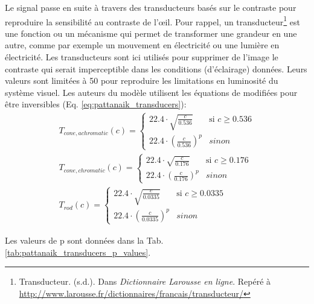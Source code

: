 	\par Le signal passe en suite à travers des transducteurs basés sur le contraste pour reproduire la sensibilité au contraste de l'œil. Pour rappel, un transducteur\footnote{Transducteur. (s.d.). Dans \textit{Dictionnaire Larousse en ligne}. Repéré à \url{http://www.larousse.fr/dictionnaires/francais/transducteur/}} est une fonction ou un mécanisme qui permet de transformer une grandeur en une autre, comme par exemple un mouvement en électricité ou une lumière en électricité. Les transducteurs sont ici utilisés pour supprimer de l'image le contraste qui serait imperceptible dans les conditions (d'éclairage) données. Leurs valeurs sont limitées à 50 pour reproduire les limitations en luminosité du système visuel. Les auteurs du modèle utilisent les équations de \citep{watson_model_1997} modifiées pour être inversibles (Eq. \ref{eq:pattanaik_transducers}):
	\begin{equation}
	\begin{array}{c}
	
	T_{cone,achromatic}(c) = \begin{cases}
	22.4 \cdot \sqrt{\frac{c}{0.536}} & \mbox{si } c \geq 0.536\\
	22.4 \cdot \left( \frac{c}{0.536} \right)^p & sinon
	\end{cases}\\
	
	T_{cone,chromatic}(c) = \begin{cases}
	22.4 \cdot \sqrt{\frac{c}{0.176}} & \mbox{si } c \geq 0.176\\
	22.4 \cdot \left( \frac{c}{0.176} \right)^p & sinon
	\end{cases}\\
	
	T_{rod}(c) = \begin{cases}
	22.4 \cdot \sqrt{\frac{c}{0.0335}} & \mbox{si } c \geq 0.0335\\
	22.4 \cdot \left( \frac{c}{0.0335} \right)^p & sinon
	\end{cases}
	
	\end{array}
	\label{eq:pattanaik_transducers}
	\end{equation}
	
	\par Les valeurs de p sont données dans la Tab. \ref{tab:pattanaik_transducers_p_values}.
	
